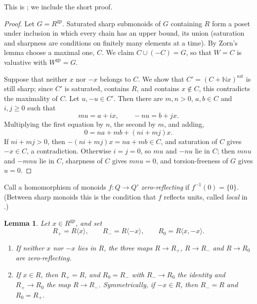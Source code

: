 \documentclass[11pt]{article}
\newcommand{\N}{\mathbb N}
\newcommand{\gp}{\mathrm{gp}}
\newcommand{\sat}{\mathrm{sat}}
\newtheorem{lemma}[theorem]{Lemma}
\theoremstyle{definition}
\theoremstyle{remark}
\begin{document}
This is \cite[Lemma~2.1.2.11]{MW}; we include the short proof.

\begin{proof}
Let \(G=R^{\gp}\).  Saturated sharp submonoids of \(G\) containing \(R\) form
a poset under inclusion in which every chain has an upper bound, its union
(saturation and sharpness are conditions on finitely many elements at a
time).  By Zorn's lemma choose a maximal one, \(C\).  We claim
\(C\cup(-C)=G\), so that \(W=C\) is valuative with \(W^{\gp}=G\).

Suppose that neither \(x\) nor \(-x\) belongs to \(C\).  We show that
\(C'=(C+\N x)^{\sat}\) is still sharp; since \(C'\) is saturated, contains
\(R\), and contains \(x\notin C\), this contradicts the maximality of \(C\).  Let \(u,-u\in C'\).  Then
there are \(m,n>0\), \(a,b\in C\) and \(i,j\geq0\) such that
\[
       mu=a+ix,\qquad -nu=b+jx .
\]
Multiplying the first equation by \(n\), the second by \(m\), and adding,
\[
       0=na+mb+(ni+mj)x.
\]
If \(ni+mj>0\), then \(-(ni+mj)x=na+mb\in C\), and saturation of \(C\) gives
\(-x\in C\), a contradiction.  Otherwise \(i=j=0\), so \(mu\) and \(-nu\) lie
in \(C\); then \(mnu\) and \(-mnu\) lie in \(C\), sharpness of \(C\) gives
\(mnu=0\), and torsion-freeness of \(G\) gives \(u=0\).
\end{proof}

Call a homomorphism of monoids \(f:Q\to Q'\) \emph{zero-reflecting} if
\(f^{-1}(0)=\{0\}\).  (Between sharp monoids this is the condition that
\(f\) reflects units, called \emph{local} in \cite[p.~15]{ogus}.)

\begin{lemma}\label{lem:zero}
Let \(x\in R^{\gp}\), and set
\[
 R_+=R\langle x\rangle,\qquad
 R_-=R\langle -x\rangle,\qquad
 R_0=R\langle x,-x\rangle .
\]
\begin{enumerate}
\item If neither \(x\) nor \(-x\) lies in \(R\), the three maps
\(R\to R_+\), \(R\to R_-\) and \(R\to R_0\) are zero-reflecting.
\item If \(x\in R\), then \(R_+=R\), and \(R_0=R_-\) with \(R_-\to R_0\) the
identity and \(R_+\to R_0\) the map \(R\to R_-\).  Symmetrically, if
\(-x\in R\), then \(R_-=R\) and \(R_0=R_+\).
\end{enumerate}
\end{lemma}
\end{document}
